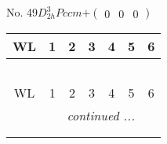 \documentclass[fleqn,9pt,landscape]{jsarticle}
\begin{document}
\newpage
No. 49\quad$D_{2h}^{3}$\quad$Pccm$\quad[ orthorhombic ]\quad$+\begin{pmatrix} 0 & 0 & 0 \end{pmatrix}$
\begin{center}
\renewcommand{\arraystretch}{1.2}
\begin{longtable}{ccccccc}
 \hline \hline
WL & 1 & 2 & 3 & 4 & 5 & 6 \\ \hline \endfirsthead

\multicolumn{6}{l}{\tablename\ \thetable{}} \\
 \hline \hline
WL & 1 & 2 & 3 & 4 & 5 & 6 \\ \hline \endhead

 \hline \hline
\multicolumn{6}{r}{\footnotesize\it continued ...} \\ \endfoot

 \hline \hline
\multicolumn{6}{r}{} \\ \endlastfoot


\end{longtable}
\end{center}
\end{document}
